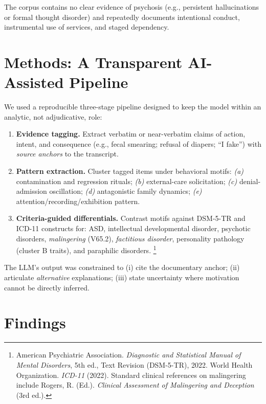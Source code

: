 \documentclass[12pt]{article}
\begin{document}
The corpus contains no clear evidence of psychosis (e.g., persistent hallucinations or formal thought disorder) and repeatedly documents intentional conduct, instrumental use of services, and staged dependency.

\section{Methods: A Transparent AI-Assisted Pipeline}
We used a reproducible three-stage pipeline designed to keep the model within an analytic, not adjudicative, role:

\begin{enumerate}[leftmargin=2em]
  \item \textbf{Evidence tagging.} Extract verbatim or near-verbatim claims of action, intent, and consequence (e.g., fecal smearing; refusal of diapers; ``I fake'') with \emph{source anchors} to the transcript.
  \item \textbf{Pattern extraction.} Cluster tagged items under behavioral motifs: \emph{(a)} contamination and regression rituals; \emph{(b)} external-care solicitation; \emph{(c)} denial-admission oscillation; \emph{(d)} antagonistic family dynamics; \emph{(e)} attention/recording/exhibition pattern.
  \item \textbf{Criteria-guided differentials.} Contrast motifs against DSM-5-TR and ICD-11 constructs for: ASD, intellectual developmental disorder, psychotic disorders, \emph{malingering} (V65.2), \emph{factitious disorder}, personality pathology (cluster B traits), and paraphilic disorders.%
  \footnote{American Psychiatric Association. \emph{Diagnostic and Statistical Manual of Mental Disorders}, 5th ed., Text Revision (DSM-5-TR), 2022. World Health Organization. \emph{ICD-11} (2022). Standard clinical references on malingering include Rogers, R. (Ed.). \emph{Clinical Assessment of Malingering and Deception} (3rd ed.).}
\end{enumerate}

The LLM’s output was constrained to (i) cite the documentary anchor; (ii) articulate \emph{alternative} explanations; (iii) state uncertainty where motivation cannot be directly inferred.

\section{Findings}
\end{document}
